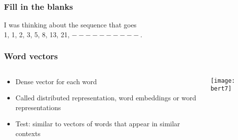 


\begin{frame}[fragile]\frametitle{Fill in the blanks}

\begin{center}
I was thinking about the sequence that goes  \\ 1, 1, 2, 3, 5, 8, 13, 21,   $----------$.
\end{center}		  

\end{frame}

\begin{frame}[fragile]\frametitle{Word vectors}

\begin{columns}
    \begin{column}[T]{0.5\linewidth}
			\begin{itemize}
			\item Dense vector for each word
			\item Called distributed representation, word embeddings or  word representations 
			\item Test: similar to vectors of words that appear in similar contexts
			\end{itemize}
    \end{column}
    \begin{column}[T]{0.5\linewidth}
			\begin{center}
			\texttt{[image: bert7]}
			\end{center}		  
    \end{column}
  \end{columns}

\end{frame}

